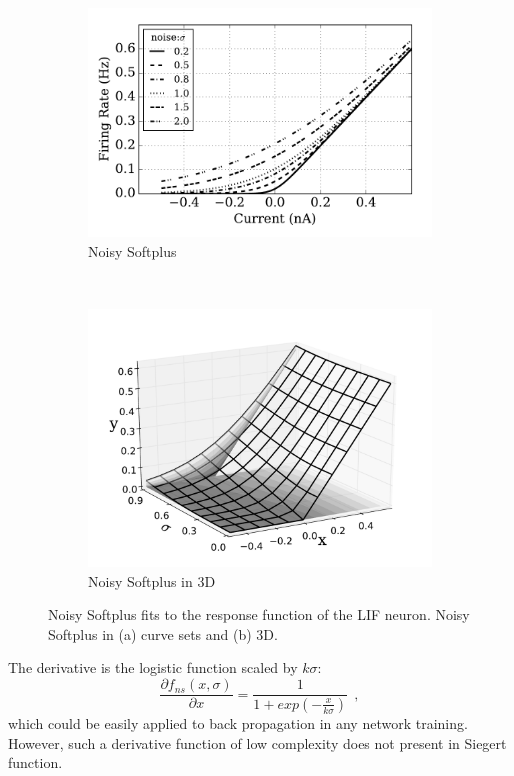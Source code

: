 	\begin{figure}[thb!]
		\centering
		\begin{subfigure}[t]{0.6\textwidth}
			\includegraphics[width=\textwidth]{pics_iconip/4.pdf}
			\caption{Noisy Softplus}
		\end{subfigure}\\
		\begin{subfigure}[t]{0.7\textwidth}
			\includegraphics[width=\textwidth]{pics_iconip/5.pdf}
			\caption{Noisy Softplus in 3D}
		\end{subfigure}
		\caption{
			Noisy Softplus fits to the response function of the LIF neuron.
			Noisy Softplus in (a) curve sets and (b) 3D.}
		\label{fig:nsp}
	\end{figure}	
	
	The derivative is the logistic function scaled by $k\sigma$:
	\begin{equation}
	\frac{\partial f_{ns}(x,\sigma)}{\partial x} = \frac{1}{1+exp(-\frac{x}{k\sigma})}~~,
	\label{equ:logist}
	\end{equation}	
	which could be easily applied to back propagation in any network training.
	However, such a derivative function of low complexity does not present in Siegert function.
	
